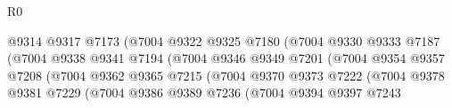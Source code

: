 \begin{lexlean}{R0}
\begin{coremodule}
                                              @9314
                                              @9317
                                              @7173
                                              (@7004
                                                @9322
                                                @9325
                                                @7180
                                                (@7004
                                                  @9330
                                                  @9333
                                                  @7187
                                                  (@7004
                                                    @9338
                                                    @9341
                                                    @7194
                                                    (@7004
                                                      @9346
                                                      @9349
                                                      @7201
                                                      (@7004
                                                        @9354
                                                        @9357
                                                        @7208
                                                        (@7004
                                                          @9362
                                                          @9365
                                                          @7215
                                                          (@7004
                                                            @9370
                                                            @9373
                                                            @7222
                                                            (@7004
                                                              @9378
                                                              @9381
                                                              @7229
                                                              (@7004
                                                                @9386
                                                                @9389
                                                                @7236
                                                                (@7004
                                                                  @9394
                                                                  @9397
                                                                  @7243

\end{coremodule}
\end{lexlean}
